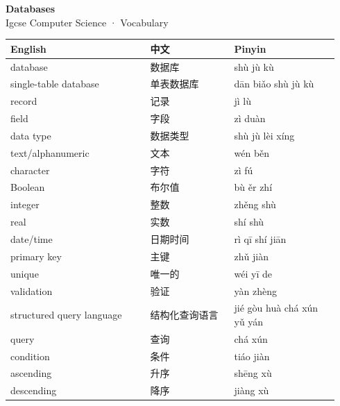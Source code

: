 \documentclass[11pt]{article}
\begin{document}
\begin{center}
  {\LARGE\bfseries Databases}\\[0.35em]
  {\large Igcse Computer Science · Vocabulary}
\end{center}
\vspace{0.6em}

\begin{longtable}{@{}p{0.40\linewidth}p{0.24\linewidth}p{0.30\linewidth}@{}}
\toprule
\textbf{English} & \textbf{中文} & \textbf{Pinyin} \\
\midrule
\endhead
\bottomrule
\endlastfoot
database & 数据库 & shù jù kù \\
single-table database & 单表数据库 & dān biǎo shù jù kù \\
record & 记录 & jì lù \\
field & 字段 & zì duàn \\
data type & 数据类型 & shù jù lèi xíng \\
text/alphanumeric & 文本 & wén běn \\
character & 字符 & zì fú \\
Boolean & 布尔值 & bù ěr zhí \\
integer & 整数 & zhěng shù \\
real & 实数 & shí shù \\
date/time & 日期时间 & rì qī shí jiān \\
primary key & 主键 & zhǔ jiàn \\
unique & 唯一的 & wéi yī de \\
validation & 验证 & yàn zhèng \\
structured query language & 结构化查询语言 & jié gòu huà chá xún yǔ yán \\
query & 查询 & chá xún \\
condition & 条件 & tiáo jiàn \\
ascending & 升序 & shēng xù \\
descending & 降序 & jiàng xù \\
\end{longtable}
\end{document}
